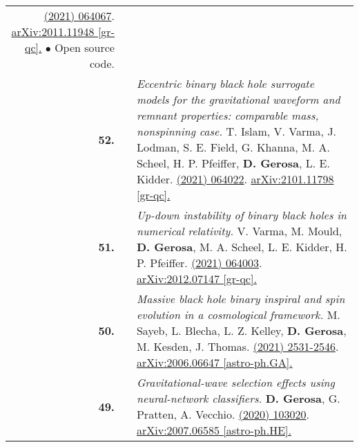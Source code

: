{\begin{longtable}{rp{0.3cm}p{15.8cm}}
\newline{}
\href{https://journals.aps.org/prd/abstract/10.1103/PhysRevD.103.064067}{\prd 103 (2021) 064067}. \href{https://arxiv.org/abs/2011.11948}{arXiv:2011.11948 [gr-qc].}
\newline{}
\textcolor{color1}{$\bullet$} Open source code.
\vspace{0.09cm}\\
%
\textbf{52.} & & \textit{Eccentric binary black hole surrogate models for the gravitational waveform and remnant properties: comparable mass, nonspinning case.}
\newline{}
T. Islam, V. Varma, J. Lodman, S. E. Field, G. Khanna, M. A. Scheel, H. P. Pfeiffer,  \textbf{D. Gerosa}, L. E. Kidder.
\newline{}
\href{https://journals.aps.org/prd/abstract/10.1103/PhysRevD.103.064022}{\prd 103 (2021) 064022}. \href{https://arxiv.org/abs/2101.11798}{arXiv:2101.11798 [gr-qc].}
\vspace{0.09cm}\\
%
\textbf{51.} & & \textit{Up-down instability of binary black holes in numerical relativity.}
\newline{}
V. Varma, M. Mould, \textbf{D. Gerosa}, M. A. Scheel, L. E. Kidder, H. P. Pfeiffer.
\newline{}
\href{https://journals.aps.org/prd/abstract/10.1103/PhysRevD.103.064003}{\prd 103 (2021) 064003}. \href{https://arxiv.org/abs/2012.07147}{arXiv:2012.07147 [gr-qc].}
\vspace{0.09cm}\\
%
\textbf{50.} & & \textit{Massive black hole binary inspiral and spin evolution in a cosmological framework.}
\newline{}
M. Sayeb, L. Blecha, L. Z. Kelley, \textbf{D. Gerosa}, M. Kesden, J. Thomas.
\newline{}
\href{https://doi.org/10.1093/mnras/staa3826}{\mnras 501 (2021) 2531-2546}. \href{https://arxiv.org/abs/2006.06647}{arXiv:2006.06647 [astro-ph.GA].}
\vspace{0.09cm}\\
%
\textbf{49.} & & \textit{Gravitational-wave selection effects using neural-network classifiers.}
\newline{}
\textbf{D. Gerosa}, G. Pratten, A. Vecchio.
\newline{}
\href{https://journals.aps.org/prd/abstract/10.1103/PhysRevD.102.103020}{\prd 102 (2020) 103020}. \href{https://arxiv.org/abs/2007.06585}{arXiv:2007.06585 [astro-ph.HE].}
\newline{}

\end{longtable}}
